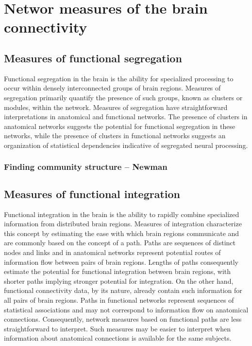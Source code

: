 \documentclass[final, paper=letter,5p,times,twocolumn]{elsarticle}
\begin{document}
\section{Networ measures of the brain connectivity}
\subsection{Measures of functional segregation}

Functional segregation in the brain is the ability for specialized processing to occur within densely interconnected groups of brain regions. Measures of segregation primarily quantify the presence of such groups, known as clusters or modules, within the network. Measures of segregation have straightforward interpretations in anatomical and functional networks. The presence of clusters in anatomical networks suggests the potential for functional segregation in these networks, while the presence of clusters in functional networks suggests an organization of statistical dependencies indicative of segregated neural processing.

\subsubsection{Finding community structure -- Newman}

\subsection{Measures of functional integration}

Functional integration in the brain is the ability to rapidly combine specialized information from distributed brain regions. Measures of integration characterize this concept by estimating the ease with which brain regions communicate and are commonly based on the concept of a path. Paths are sequences of distinct nodes and links and in anatomical networks represent potential routes of information flow between pairs of brain regions. Lengths of paths consequently estimate the potential for functional integration between brain regions, with shorter paths implying stronger potential for integration. On the other hand, functional connectivity data, by its nature, already contain such information for all pairs of brain regions. Paths in functional networks represent sequences of statistical associations and may not correspond to information flow on anatomical connections. Consequently, network measures based on functional paths are less straightforward to interpret. Such measures may be easier to interpret when information about anatomical connections is available for the same subjects.
\end{document}
